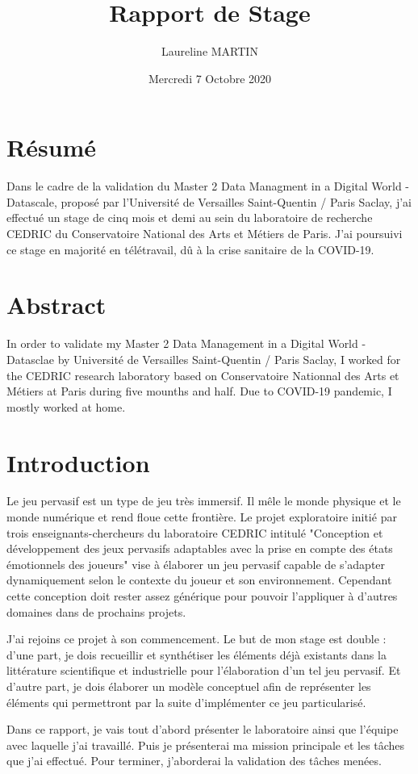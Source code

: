 \documentclass{article}
\title{Rapport de Stage}
\author{Laureline MARTIN}
\date{Mercredi 7 Octobre 2020}
\begin{document}
\maketitle

\newpage
\renewcommand{\contentsname}{Table des matières}\tableofcontents

\newpage
\section{Résumé}
	Dans le cadre de la validation du Master 2 Data Managment in a Digital World - Datascale, proposé par l'Université de Versailles Saint-Quentin / Paris Saclay, j'ai effectué un stage de cinq mois et demi au sein du laboratoire de recherche CEDRIC du Conservatoire National des Arts et Métiers de Paris.
	J'ai poursuivi ce stage en majorité en télétravail, dû à la crise sanitaire de la COVID-19.

\section{Abstract}
	In order to validate my Master 2 Data Management in a Digital World - Datasclae by Université de Versailles Saint-Quentin / Paris Saclay, I worked for the CEDRIC research laboratory based on Conservatoire Nationnal des Arts et Métiers at Paris during five mounths and half.
	Due to COVID-19 pandemic, I mostly worked at home.

\section{Introduction}
	Le jeu pervasif est un type de jeu très immersif. 
	Il mêle le monde physique et le monde numérique et rend floue cette frontière. 
	Le projet exploratoire initié par trois enseignants-chercheurs du laboratoire CEDRIC intitulé "Conception et développement des jeux pervasifs adaptables avec la prise en compte des états émotionnels des joueurs" vise à élaborer un jeu pervasif capable de s'adapter dynamiquement selon le contexte du joueur et son environnement. 
	Cependant cette conception doit rester assez générique pour pouvoir l'appliquer à d'autres domaines dans de prochains projets.\par
	J'ai rejoins ce projet à son commencement. 
	Le but de mon stage est double : 
	d'une part, je dois recueillir et synthétiser les éléments déjà existants dans la littérature scientifique et industrielle pour l'élaboration d'un tel jeu pervasif. 
	Et d'autre part, je dois élaborer un modèle conceptuel afin de représenter les éléments qui permettront par la suite d'implémenter ce jeu particularisé.\par
	Dans ce rapport, je vais tout d'abord présenter le laboratoire ainsi que l'équipe avec laquelle j'ai travaillé. Puis je présenterai ma mission principale et les tâches que j'ai effectué.
	Pour terminer, j'aborderai la validation des tâches menées.
\end{document}

